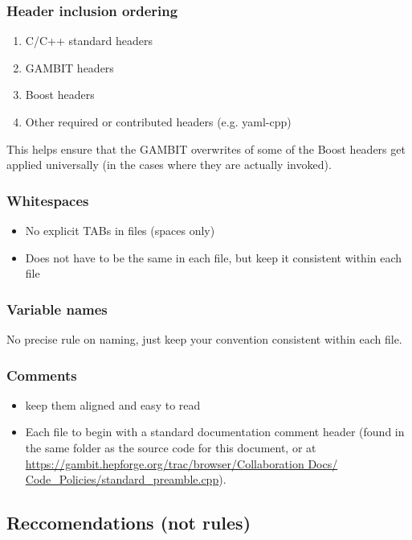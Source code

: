 \subsubsection{Header inclusion ordering} 
\begin{enumerate}
  \item C/C++ standard headers
  \item GAMBIT headers
  \item Boost headers
  \item Other required or contributed headers (e.g. yaml-cpp)
\end{enumerate}
This helps ensure that the GAMBIT overwrites of some of the Boost headers get applied universally (in the cases where they are actually invoked).

\subsubsection{Whitespaces} 
\begin{itemize} 
  \item No explicit TABs in files (spaces only)
  \item Does not have to be the same in each file, but keep it consistent within each file
\end{itemize}

\subsubsection{Variable names} No precise rule on naming, just keep your convention consistent within each file.

\subsubsection{Comments}
\label{comments} 
\begin{itemize} 
  \item keep them aligned and easy to read
  \item Each file to begin with a standard documentation comment header (found in the same folder as the source code for this document, or at \href{https://gambit.hepforge.org/trac/browser/Collaboration\%20Docs/Code\_Policies/standard_preamble.cpp}{https://gambit.hepforge.org/trac/browser/Collaboration Docs/\\Code\_Policies/standard\_preamble.cpp}).
\end{itemize} 


\subsection{Reccomendations (not rules)}

